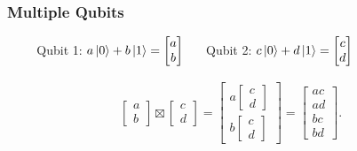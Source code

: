 \documentclass{beamer}
\theoremstyle{definition}
\begin{document}

\begin{frame}
\frametitle{Multiple Qubits}
\pause
$\hspace{1cm}$Qubit 1: $a\left\vert{0}\right\rangle + b\left\vert{1}\right\rangle = \begin{bmatrix} a\\b \end{bmatrix} \hspace{0.5cm}$ Qubit 2: $c\left\vert{0}\right\rangle + d\left\vert{1}\right\rangle = \begin{bmatrix}
c\\d
\end{bmatrix}$




\pause
\begin{align*}
\begin{bmatrix}
a\\b
\end{bmatrix}
\boxtimes
\begin{bmatrix}
c\\d
\end{bmatrix} = \begin{bmatrix}
a\begin{bmatrix}
c\\d
\end{bmatrix}\\
b\begin{bmatrix}
c\\d
\end{bmatrix}
\end{bmatrix}
=
\begin{bmatrix}
ac\\ad\\bc\\bd
\end{bmatrix}.
\end{align*}
\end{frame}
\end{document}
